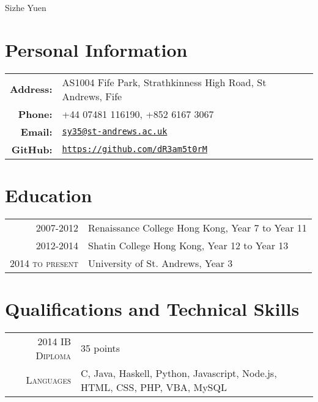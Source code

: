 \documentclass{article}
\begin{document}
\pagestyle{empty} %


\par{\centering
		{\Huge Sizhe Yuen
	}\bigskip\par}

\section*{Personal Information}

\begin{tabular}{rl}
    \textbf{Address:}   & AS1004 Fife Park, Strathkinness High Road, St Andrews, Fife \\
    \textbf{Phone:}     & +44 07481 116190, +852 6167 3067 \\
    \textbf{Email:}     & \texttt{\href{mailto:sy35@st-andrews.ac.uk}{sy35@st-andrews.ac.uk}} \\
    \textbf{GitHub:}    & \texttt{\href{https://github.com/dR3am5t0rM}{https://github.com/dR3am5t0rM}}
\end{tabular}

\section*{Education}
\begin{tabular}{r|p{14cm}}

\textsc{2007-2012} & Renaissance College Hong Kong, Year 7 to Year 11\\

\textsc{2012-2014} & Shatin College Hong Kong, Year 12 to Year 13\\

\textsc{2014 to present} & University of St. Andrews, Year 3\\

\end{tabular}
\section*{Qualifications and Technical Skills}
\begin{tabular}{r|p{14cm}}
\textsc{2014 IB Diploma} &  35 points\\
\textsc{Languages} & C, Java, Haskell, Python, Javascript, Node.js, HTML, CSS, PHP, VBA, MySQL\\
\end{tabular}
\end{document}
